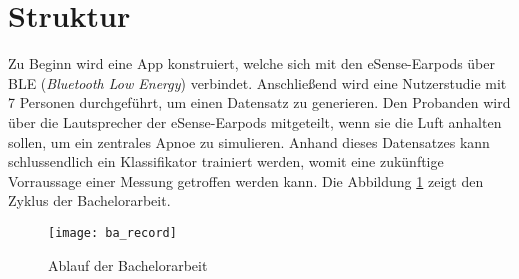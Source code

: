 \section{Struktur}
Zu Beginn wird eine App konstruiert, welche sich mit den eSense-Earpods über BLE (\textit{Bluetooth Low Energy}) verbindet.
Anschließend wird eine Nutzerstudie mit 7 Personen durchgeführt, um einen Datensatz zu generieren.
Den Probanden wird über die Lautsprecher der eSense-Earpods mitgeteilt, wenn sie die Luft anhalten sollen, um ein zentrales Apnoe zu simulieren.
Anhand dieses Datensatzes kann schlussendlich ein Klassifikator trainiert werden, womit eine zukünftige Vorraussage einer Messung getroffen werden kann.
Die Abbildung \ref{introduction:ba_record} zeigt den Zyklus der Bachelorarbeit.

\begin{figure}[h]
  \centering
  \texttt{[image: ba\_record]}
  \caption{Ablauf der Bachelorarbeit}
  \label{introduction:ba_record}
\end{figure}